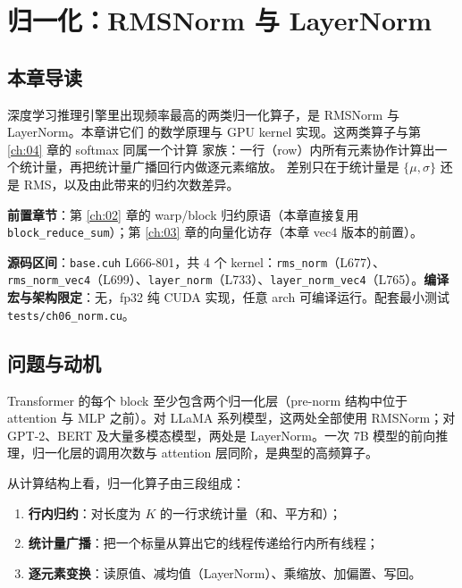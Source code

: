 \chapter{归一化：RMSNorm 与 LayerNorm}\label{ch:06}

\section{本章导读}

深度学习推理引擎里出现频率最高的两类归一化算子，是 RMSNorm 与 LayerNorm。本章讲它们
的数学原理与 GPU kernel 实现。这两类算子与第 \ref{ch:04} 章的 softmax 同属一个计算
家族：一行（row）内所有元素协作计算出一个统计量，再把统计量广播回行内做逐元素缩放。
差别只在于统计量是 $\{\mu,\sigma\}$ 还是 RMS，以及由此带来的归约次数差异。

\textbf{前置章节}：第 \ref{ch:02} 章的 warp/block 归约原语（本章直接复用 \texttt{block\_\allowbreak{}reduce\_\allowbreak{}sum}）；第 \ref{ch:03} 章的向量化访存（本章 vec4 版本的前置）。

\textbf{源码区间}：\texttt{base.cuh} L666-801，共 4 个 kernel：\texttt{rms\_norm}（L677）、\texttt{rms\_\allowbreak{}norm\_\allowbreak{}vec4}（L699）、\texttt{layer\_norm}（L733）、\texttt{layer\_\allowbreak{}norm\_\allowbreak{}vec4}（L765）。\textbf{编译宏与架构限定}：无，fp32 纯 CUDA 实现，任意 arch 可编译运行。配套最小测试 \texttt{tests/\allowbreak{}ch06\_\allowbreak{}norm.\allowbreak{}cu}。

\section{问题与动机}

Transformer 的每个 block 至少包含两个归一化层（pre-norm 结构中位于 attention 与 MLP 之前）。对 LLaMA 系列模型，这两处全部使用 RMSNorm；对 GPT-2、BERT 及大量多模态模型，两处是 LayerNorm。一次 7B 模型的前向推理，归一化层的调用次数与 attention 层同阶，是典型的高频算子。

从计算结构上看，归一化算子由三段组成：
\begin{enumerate}
  \item \textbf{行内归约}：对长度为 $K$ 的一行求统计量（和、平方和）；
  \item \textbf{统计量广播}：把一个标量从算出它的线程传递给行内所有线程；
  \item \textbf{逐元素变换}：读原值、减均值（LayerNorm）、乘缩放、加偏置、写回。
\end{enumerate}

